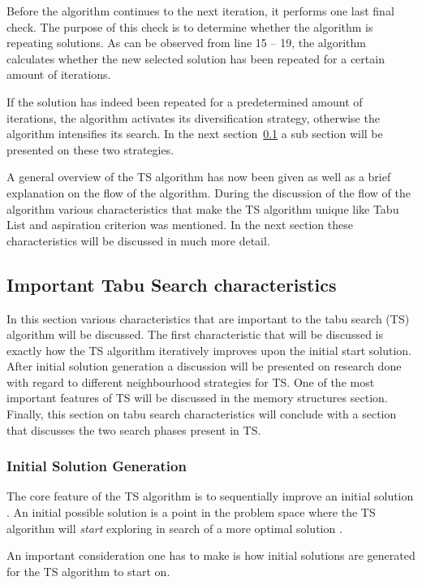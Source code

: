 Before the algorithm continues to the next iteration, it performs one last final check. The purpose of this check is to determine whether the algorithm is repeating solutions. As can be observed from line 15 -- 19, the algorithm calculates whether the new selected solution has been repeated for a certain amount of iterations. 

If the solution has indeed been repeated for a predetermined amount of iterations, the algorithm activates its diversification strategy, otherwise the algorithm intensifies its search. In the next section~\ref{sec:TScharacteristics} a sub section will be presented on these two strategies.

A general overview of the TS algorithm has now been given as well as a brief explanation on the flow of the algorithm. During the discussion of the flow of the algorithm various characteristics that make the TS algorithm unique like Tabu List and aspiration criterion was mentioned. In the next section these characteristics will be discussed in much more detail.

\subsection{Important Tabu Search characteristics}
\label{sec:TScharacteristics}
In this section various characteristics that are important to the tabu search (TS) algorithm will be discussed. The first characteristic that will be discussed is exactly how the TS algorithm iteratively improves upon the initial start solution. After initial solution generation a discussion will be presented on research done with regard to different neighbourhood strategies for TS. One of the most important features of TS will be discussed in the memory structures section. Finally, this section on tabu search characteristics will conclude with a section that discusses the two search phases present in TS.

\subsubsection{Initial Solution Generation}
The core feature of the TS algorithm is to sequentially improve an initial solution \cite{TSHazardous}. An initial possible solution is a point in the problem space where the TS algorithm will \emph{start} exploring in search of a more optimal solution \cite{AIModernApproach,TSHazardous}.

An important consideration one has to make is how initial solutions are generated for the TS algorithm to start on\cite{AIModernApproach,TSHazardous}.


